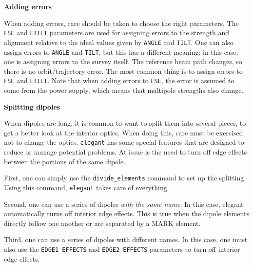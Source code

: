 {\bf Adding errors}

When adding errors, care should be taken to choose the right
parameters.  The \verb|FSE| and \verb|ETILT| parameters are used for
assigning errors to the strength and alignment relative to the ideal
values given by \verb|ANGLE| and \verb|TILT|.  One can also assign 
errors to \verb|ANGLE| and \verb|TILT|, but this has a different meaning:
in this case, one is assigning errors to the survey itself.  The reference
beam path changes, so there is no orbit/trajectory error. The most common
thing is to assign errors to \verb|FSE| and \verb|ETILT|.  Note that when
adding errors to \verb|FSE|, the error is assumed to come from the power
supply, which means that multipole strengths also change.

{\bf Splitting dipoles}

When dipoles are long, it is
common to want to split them into several pieces, to get a better look
at the interior optics.  When doing this, care must be exercised not
to change the optics.  {\tt elegant} has some special features that
are designed to reduce or manage potential problems. At issue is the
need to turn off edge effects between the portions of the same dipole.

First, one can simply use the \verb|divide_elements| command to set up
the splitting.  Using this command, {\tt elegant} takes care of everything.

Second, one can use a series of dipoles {\em with the same name}.  In this case,
elegant automatically turns off interior edge effects.  This is true when the
dipole elements directly follow one another or are separated by a MARK element.

Third, one can use a series of dipoles with different names.  In this case, one
must also use the \verb|EDGE1_EFFECTS| and \verb|EDGE2_EFFECTS| parameters to
turn off interior edge effects.  

